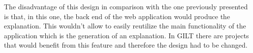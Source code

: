 The disadvantage of this design in comparison with the one previously presented is that, in this one, the back end of the web application would produce the explanation.
This wouldn't allow to easily reutilize the main functionality of the application which is the generation of an explanation.
In GILT there are projects that would benefit from this feature and therefore the design had to be changed.
